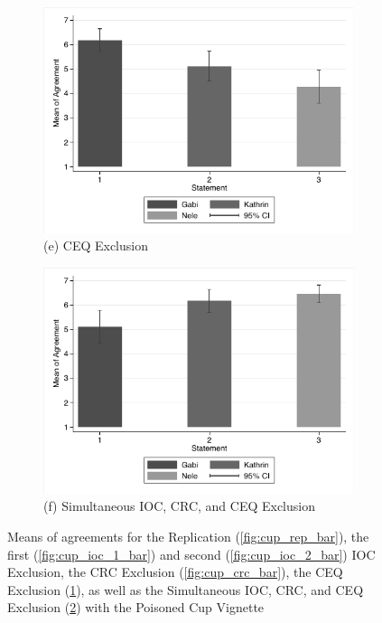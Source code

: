\documentclass[egregdoesnotlikesansseriftitles,12pt]{scrartcl}
\begin{document}
\begin{landscape}
\begin{figure}[h!]
\begin{subfigure}[t]{0.28\textwidth}
      \includegraphics[scale=0.7]{figures/cup_ceq_bar.pdf}
      \caption{\textsf{\scriptsize(e) CEQ Exclusion}}
      \label{fig:cup_ceq_bar}
   \end{subfigure}
   \begin{subfigure}[t]{0.28\textwidth}
      \includegraphics[scale=0.7]{figures/cup_com_bar.pdf}
      \caption{\textsf{\scriptsize(f) Simultaneous IOC, CRC, and CEQ Exclusion}}
      \label{fig:cup_com_bar}
   \end{subfigure}
   \caption{Means of agreements for the Replication (\ref{fig:cup_rep_bar}), the first (\ref{fig:cup_ioc_1_bar}) and second (\ref{fig:cup_ioc_2_bar}) IOC Exclusion, the CRC Exclusion (\ref{fig:cup_crc_bar}), the CEQ Exclusion (\ref{fig:cup_ceq_bar}), as well as the Simultaneous IOC, CRC, and CEQ Exclusion (\ref{fig:cup_com_bar}) with the Poisoned Cup Vignette}\label{fig:cup}
\end{figure}
\end{landscape}
\end{document}
